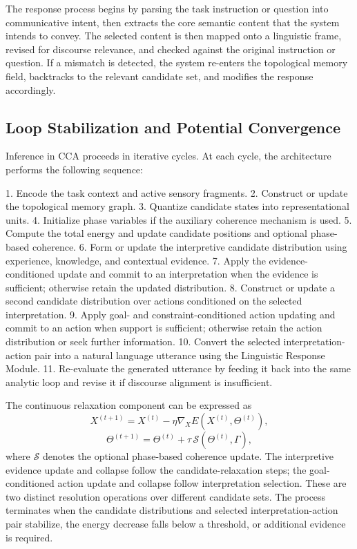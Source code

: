 \documentclass[10pt,journal,compsoc]{IEEEtran}
\begin{document}
The response process begins by parsing the task instruction or question into communicative intent, then extracts the core semantic content that the system intends to convey. The selected content is then mapped onto a linguistic frame, revised for discourse relevance, and checked against the original instruction or question. If a mismatch is detected, the system re-enters the topological memory field, backtracks to the relevant candidate set, and modifies the response accordingly.

\subsection{Loop Stabilization and Potential Convergence}

Inference in CCA proceeds in iterative cycles. At each cycle, the architecture performs the following sequence:

1. Encode the task context and active sensory fragments.
2. Construct or update the topological memory graph.
3. Quantize candidate states into representational units.
4. Initialize phase variables if the auxiliary coherence mechanism is used.
5. Compute the total energy and update candidate positions and optional phase-based coherence.
6. Form or update the interpretive candidate distribution using experience, knowledge, and contextual evidence.
7. Apply the evidence-conditioned update and commit to an interpretation when the evidence is sufficient; otherwise retain the updated distribution.
8. Construct or update a second candidate distribution over actions conditioned on the selected interpretation.
9. Apply goal- and constraint-conditioned action updating and commit to an action when support is sufficient; otherwise retain the action distribution or seek further information.
10. Convert the selected interpretation-action pair into a natural language utterance using the Linguistic Response Module.
11. Re-evaluate the generated utterance by feeding it back into the same analytic loop and revise it if discourse alignment is insufficient.

The continuous relaxation component can be expressed as
\[
X^{(t+1)} = X^{(t)} - \eta \nabla_X E(X^{(t)},\Theta^{(t)}),
\]
\[
\Theta^{(t+1)} = \Theta^{(t)} + \tau \,\mathcal{S}(\Theta^{(t)},\Gamma),
\]
where $\mathcal{S}$ denotes the optional phase-based coherence update. The interpretive evidence update and collapse follow the candidate-relaxation steps; the goal-conditioned action update and collapse follow interpretation selection. These are two distinct resolution operations over different candidate sets. The process terminates when the candidate distributions and selected interpretation-action pair stabilize, the energy decrease falls below a threshold, or additional evidence is required.
\end{document}
